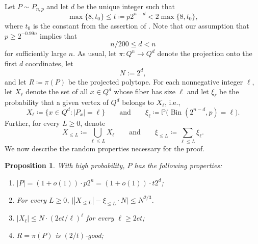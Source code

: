 \documentclass[11pt,a4paper,oneside,reqno]{amsart}
\newtheorem{proposition}[theorem]{Proposition}
\newcommand{\PP}{\mathbb{P}}
\DeclareMathOperator{\Bin}{Bin}
\begin{document}
Let $P \sim P_{n,p}$ and let $d$ be the unique integer such that
\begin{equation}
  \label{eq:t}
  \max\{8, t_0\} \le t \coloneqq p2^{n-d} < 2\max\{8, t_0\},
\end{equation}
where $t_0$ is the constant from the assertion of .
Note that our assumption that $p \geq 2^{-0.99n}$ implies that
\begin{equation}
  \label{eq:d}
  n/200 \leq d < n
\end{equation}
for sufficiently large $n$.
As usual, let $\pi \colon Q^n \to Q^d$ denote the projection onto the first $d$ coordinates, let
\[ N:=2^d,\] and let $R \coloneqq \pi(P)$ be the projected polytope.  For each nonnegative integer $\ell$, let $X_\ell$ denote the set of all $x \in Q^d$ whose fiber has size $\ell$ and let $\xi_\ell$ be the probability that a given vertex of $Q^d$ belongs to $X_\ell$, i.e.,
\begin{equation}
  \label{eq:Xl}
  X_\ell \coloneqq \{x \in Q^d : |P_x| = \ell\}
  \qquad
  \text{and}
  \qquad
  \xi_\ell \coloneqq \PP\bigr(\Bin(2^{n-d},p) = \ell\bigr).
\end{equation}
Further, for every $L \ge 0$, denote
\[
  X_{\le L} \coloneqq \bigcup_{\ell \le L} X_\ell
  \qquad
  \text{and}
  \qquad
  \xi_{\le L} \coloneqq \sum_{\ell \le L} \xi_\ell.
\]
We now describe the random properties necessary for the proof.

\begin{proposition}\label{prop:Pprop}
  With high probability, $P$ has the following properties:
  \begin{enumerate}[label=(P\arabic*)]
  \item
    \label{item:P-size}
    $|P| = (1 + o(1)) \cdot p2^n = (1+o(1)) \cdot t 2^d$;
  \item
    \label{item:P-fibers-empirical-dist}
    For every $L \ge 0$, $\bigl||X_{\le L}| - \xi_{\le L} \cdot N\bigr| \le N^{2/3}$.
  \item
    \label{item:P-fibers-tail}
    $|X_\ell| \le N\cdot(2et/\ell)^\ell$ for every $\ell \ge 2et$;
  \item
    \label{item:P-pi-good}
    $R = \pi(P)$ is $(2/t)$-good;
  \end{enumerate}
\end{proposition}
\end{document}
